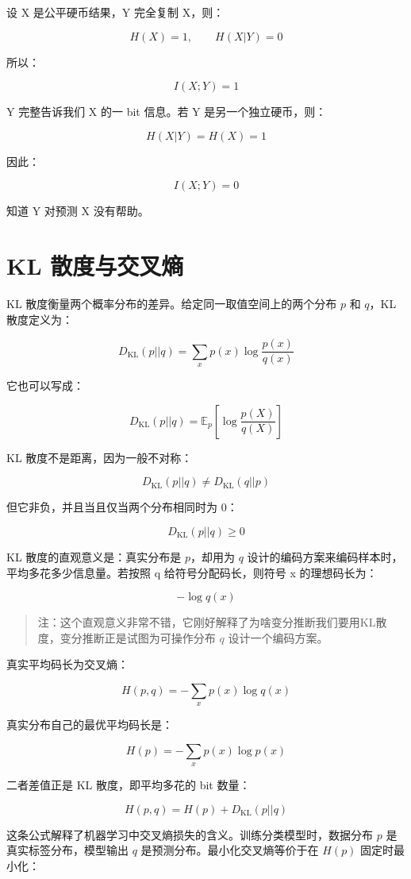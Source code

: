 设 X 是公平硬币结果，Y 完全复制 X，则：

\[
H(X)=1,\qquad H(X|Y)=0
\]

所以：

\[
I(X;Y)=1
\]

Y 完整告诉我们 X 的一 bit 信息。若 Y 是另一个独立硬币，则：

\[
H(X|Y)=H(X)=1
\]

因此：

\[
I(X;Y)=0
\]

知道 Y 对预测 X 没有帮助。

\section{KL 散度与交叉熵}

KL 散度衡量两个概率分布的差异。给定同一取值空间上的两个分布 \(p\) 和 \(q\)，KL 散度定义为：

\[
D_{\mathrm{KL}}(p||q)=\sum_{x}p(x)\log\frac{p(x)}{q(x)}
\]

它也可以写成：

\[
D_{\mathrm{KL}}(p||q)=\mathbb{E}_{p}\left[\log\frac{p(X)}{q(X)}\right]
\]

KL 散度不是距离，因为一般不对称：

\[
D_{\mathrm{KL}}(p||q)\ne D_{\mathrm{KL}}(q||p)
\]

但它非负，并且当且仅当两个分布相同时为 0：

\[
D_{\mathrm{KL}}(p||q)\ge 0
\]

KL 散度的直观意义是：真实分布是 \(p\)，却用为 \(q\) 设计的编码方案来编码样本时，平均多花多少信息量。若按照 q 给符号分配码长，则符号 x 的理想码长为：

\[
-\log q(x)
\]

\begin{quote}
注：这个直观意义非常不错，它刚好解释了为啥变分推断我们要用KL散度，变分推断正是试图为可操作分布 \(q\) 设计一个编码方案。
\end{quote}

真实平均码长为交叉熵：

\[
H(p,q)=-\sum_x p(x)\log q(x)
\]

真实分布自己的最优平均码长是：

\[
H(p)=-\sum_x p(x)\log p(x)
\]

二者差值正是 KL 散度，即平均多花的 bit 数量：

\[
H(p,q)=H(p)+D_{\mathrm{KL}}(p||q)
\]

这条公式解释了机器学习中交叉熵损失的含义。训练分类模型时，数据分布 \(p\) 是真实标签分布，模型输出 \(q\) 是预测分布。最小化交叉熵等价于在 \(H(p)\) 固定时最小化：

